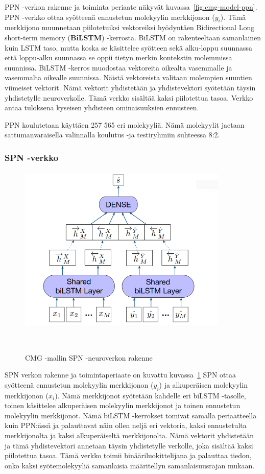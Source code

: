 \documentclass[finnish,twoside,censored,tkt,sw-line]{HYthesisML}
\begin{document}
PPN -verkon rakenne ja toiminta periaate näkyvät kuvassa~\ref{fig:cmg-model-ppn}.
PPN -verkko ottaa syötteenä ennustetun molekyylin merkkijonon (\(y_i\)).
Tämä merkkijono muunnetaan piilotetuiksi vektoreiksi hyödyntäen Bidirectional Long short-term memory (\textbf{BiLSTM}) -kerrosta.
BiLSTM on rakenteeltaan samanlainen kuin LSTM taso, mutta koska se käsittelee syötteen sekä alku-loppu suunnassa että loppu-alku suunnassa se oppii tietyn merkin kontekstin molemmissa suunnissa.
BiLSTM -kerros muodostaa vektoreita oikealta vasemmalle ja vasemmalta oikealle suunnissa.
Näistä vektoreista valitaan molempien suuntien viimeiset vektorit.
Nämä vektorit yhdistetään ja yhdistevektori syötetään täysin yhdistetylle neuroverkolle.
Tämä verkko sisältää kaksi piilotettua tasoa.
Verkko antaa tuloksena kyseisen yhdisteen ominaisuuksien ennusteen.

PPN koulutetaan käyttäen 257 565 eri molekyyliä.
Nämä molekyylit jaetaan sattumanvaraisella valinnalla koulutus -ja testiryhmiin suhteessa 8:2.

\subsubsection{SPN -verkko}

\begin{figure}[!ht]
    \centering
    \includegraphics[width=10cm, height=8cm]{cmg-similarity-network.png}
    \caption{CMG -mallin SPN -neuroverkon rakenne}
    {~\cite{ShinBonggun}}
    \label{fig:cmg-model-spn}
\end{figure}

SPN verkon rakenne ja toimintaperiaate on kuvattu kuvassa~\ref{fig:cmg-model-spn}
SPN ottaa syötteenä ennustetun molekyylin merkkijonon (\(y_i\)) ja alkuperäisen molekyylin merkkijonon (\(x_i\)).
Nämä merkkijonot syötetään kahdelle eri biLSTM -tasolle, toinen käsittelee alkuperäisen molekyylin merkkijonot ja toinen ennustetun molekyylin merkkijonot.
Nämä biLSTM -kerrokset tomivat samalla periaatteella kuin PPN:ässä ja palauttavat näin ollen neljä eri vektoria, kaksi ennustetulta merkkijonolta ja kaksi alkuperäiseltä merkkijonolta.
Nämä vektorit yhdistetään ja tämä yhdistevektori annetaan täysin yhdistetylle verkolle, joka sisältää kaksi piilotettua tasoa.
Tämä verkko toimii binääriluokittelijana ja palauttaa tiedon, onko kaksi syötemolekyyliä samanlaisia määritellyn samanlaisuusrajan mukaan.
\end{document}
